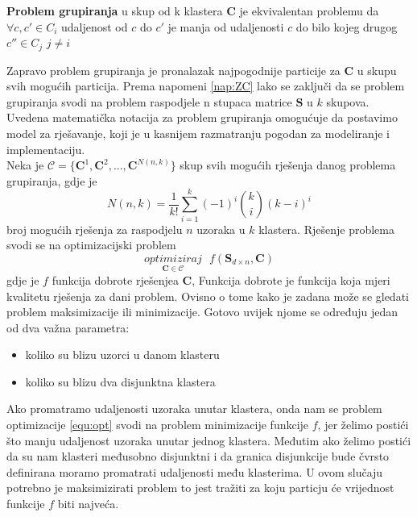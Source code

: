 \documentclass[a4paper,twoside,12pt]{memoir} %
\begin{document}
\begin{defn}
\label{def:hard-formal}
\textbf{Problem grupiranja} u skup od k klastera $\mathbf{C}$ je ekvivalentan problemu da\\
$\forall c, c' \in C_i$ udaljenost od $c$ do $c'$ je manja od udaljenosti $c$ do bilo kojeg drugog $c'' \in C_j$ $ j \neq i$ 
\end{defn}
Zapravo problem grupiranja je pronalazak najpogodnije particije za $\mathbf{C}$ u skupu svih mogućih particija.
Prema napomeni \ref{nap:ZC} lako se zaključi da se problem grupiranja svodi na problem raspodjele n stupaca matrice $\mathbf{S}$ u $k$ skupova.
Uvedena matematička notacija za problem grupiranja omogućuje da postavimo model za rješavanje, koji je u kasnijem razmatranju pogodan za modeliranje i implementaciju.\\
Neka je  $\mathcal{C} = \{ \mathbf{C}^1, \mathbf{C}^2, ..., \mathbf{C}^{N(n,k)}  \}$ skup svih mogućih rješenja danog problema grupiranja, gdje je
\begin{equation}
\label{equ:grup_rjs}
N(n,k) = \frac{1}{k!}\sum_{i=1}^{k}(-1)^i{{k}\choose{i}}(k-i)^i
\end{equation}
broj mogućih rješenja za raspodjelu $n$ uzoraka u $k$ klastera. Rješenje problema svodi se na optimizacijski problem
\begin{equation}
\label{equ:opt}
\underset{\mathbf{C} \in \mathcal{C}}{optimiziraj} \textbf{  }f(\mathbf{S}_{d\times n}, \mathbf{C})
\end{equation}
gdje je $f$ funkcija dobrote rješenjea $\mathbf{C}$, Funkcija dobrote je funkcija koja mjeri kvalitetu rješenja za dani problem. Ovisno o tome kako je zadana može se gledati problem maksimizacije ili minimizacije. Gotovo uvijek njome se određuju jedan od dva važna parametra:
\begin{itemize}
\item koliko su blizu uzorci u danom klasteru
\item koliko su blizu dva disjunktna klastera
\end{itemize}
Ako promatramo udaljenosti uzoraka unutar klastera, onda nam se problem optimizacije \ref*{equ:opt} svodi na problem minimizacije funkcije $f$, jer želimo postići što manju udaljenost uzoraka unutar jednog klastera. Međutim ako želimo postići da su nam klasteri međusobno disjunktni i da granica disjunkcije bude čvrsto definirana moramo promatrati udaljenosti među klasterima. U ovom slučaju potrebno je maksimizirati problem to jest tražiti za koju particju će vrijednost funkcije $f$ biti najveća. \\
\end{document}

